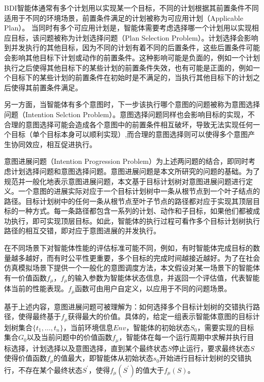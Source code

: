 BDI智能体通常有多个计划用以实现某一个目标，不同的计划根据其前置条件不同适用于不同的环境场景，前置条件满足的计划被称为可应用计划（Applicable Plan）。
当同时有多个可应用计划是，智能体需要考虑选择哪一个计划用以实现相应目标，该问题被称为计划选择问题（Plan Selection Problem）。计划选择会影响到并发执行的其他目标，因为不同的计划有着不同的后置条件，这些后置条件可能会影响其他目标下计划或动作的前置条件。这种影响可能是负面的，例如一个计划执行之后使得其他目标下的某些计划的前置条件失效，也有可能是正面的，例如一个目标下的某些计划的前置条件在初始时是不满足的，当执行其他目标下的计划之后使得其前置条件满足。

另一方面，当智能体有多个意图时，下一步该执行哪个意图的问题被称为意图选择问题（Intention Selction Problem）。意图选择问题同样也会影响目标的实现，不合理的意图选择可能会造成各个意图中的前置条件相互破坏，导致无法实现任何一个目标（单个目标本身可以顺利实现）,而合理的意图选择则可以使得多个意图产生协同效应，相互促进执行。

意图进展问题（Intention Progression Problem）为上述两问题的结合，即同时考虑计划选择问题和意图选择问题。意图进展问题是本文所研究的问题的基础。为了规范并一般化地表示意图进展问题，本文基于目标计划树对意图进展问题进行定义。一个意图的进展实际对应于一个目标计划树中一条从根节点到一个叶子结点的路径。目标计划树中的任何一条从根节点至叶子节点的路径都对应于实现其顶层目标的一种方式。每一条路径都包含一系列的计划、动作和子目标，如果他们都被成功执行，即可实现顶层目标。如此，智能体的执行过程可看作多个目标计划树执行路径的相互交错，即对应于意图进展的并发执行。

%
在不同场景下对智能体性能的评估标准可能不同，例如，有时智能体完成目标的数量越多越好，而有时公平性更重要，多个目标的完成时间越接近越好。为了在社会仿真模拟场景下提供一个一般化的意图调度方法，本文假设对某一场景下的智能体有一价值函数$f_{\mu}$，$f_{\mu}$的输入参数为智能体状态信息，并返回一个评估值，代表智能体当前的性能表现。$f_{\mu}$函数可由用户自定义，以应用于不同的问题场景。

基于上述内容，意图进展问题可被理解为：如何选择多个目标计划树的交错执行路径，使得最终基于$f_{\mu}$获得最大的价值。具体的，给定一组表示智能体意图的目标计划树集合$\{t_1, \dots, t_n\}$，当前环境信息$Env$，智能体的初始状态$S_0$，需要实现的目标集合$G_0$以及当前问题中的价值函数$f_{\mu}$，智能体在每一个运行周期中求解并执行目标选择，计划选择以及意图选择，直到某个最终状态$S$停止运行，要求最终状态$S$使得价值函数$f_{\mu}$的值最大，即智能体从初始状态$s_0$开始进行目标计划树的交错执行，不存在某个最终状态$S^{\prime}$，使得$f_{\mu}(S^{\prime})$的值大于$f_{\mu}(S)$。

